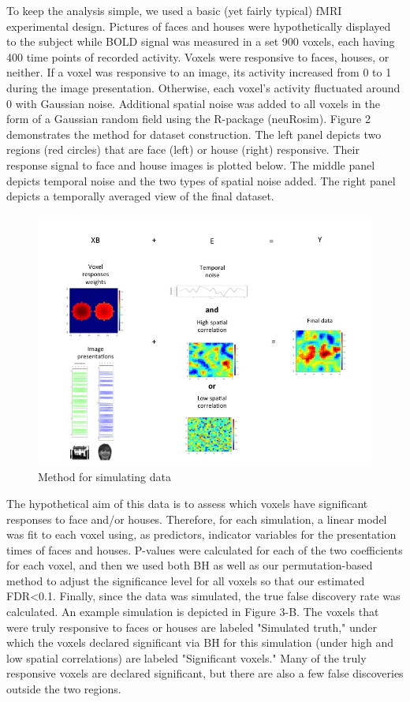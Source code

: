 \documentclass[11pt,notitlepage]{article}
\begin{document}
To keep the analysis simple, we used a basic (yet fairly typical) fMRI experimental design. Pictures of faces and houses were hypothetically displayed to the subject while BOLD signal was measured in a set 900 voxels, each having 400 time points of recorded activity. Voxels were responsive to faces, houses, or neither. If a voxel was responsive to an image, its activity increased from 0 to 1 during the image presentation. Otherwise, each voxel's activity fluctuated around 0 with Gaussian noise. Additional spatial noise was added to all voxels in the form of a Gaussian random field using the R-package (neuRosim). Figure 2 demonstrates the method for dataset construction. The left panel depicts two regions (red circles) that are face (left) or house (right) responsive. Their response signal to face and house images is plotted below. The middle panel depicts temporal noise and the two types of spatial noise added. The right panel depicts a temporally averaged view of the final dataset. 


\begin{figure}[h c] %
\centering
\includegraphics[scale = .60]{Figures/Slide2.jpg}
\caption{\footnotesize Method for simulating data}
\end{figure}


The hypothetical aim of this data is to assess which voxels have significant responses to face and/or houses. Therefore, for each simulation, a linear model was fit to each voxel using, as predictors, indicator variables for the presentation times of faces and houses. P-values were calculated for each of the two coefficients for each voxel, and then we used both BH as well as our permutation-based method to adjust the significance level for all voxels so that our estimated FDR<0.1. Finally, since the data was simulated, the true false discovery rate was calculated. An example simulation is depicted in Figure 3-B. The voxels that were truly responsive to faces or houses are labeled "Simulated truth," under which the voxels declared significant via BH for this simulation (under high and low spatial correlations) are labeled "Significant voxels." Many of the truly responsive voxels are declared significant, but there are also a few false discoveries outside the two regions. 
\end{document}
